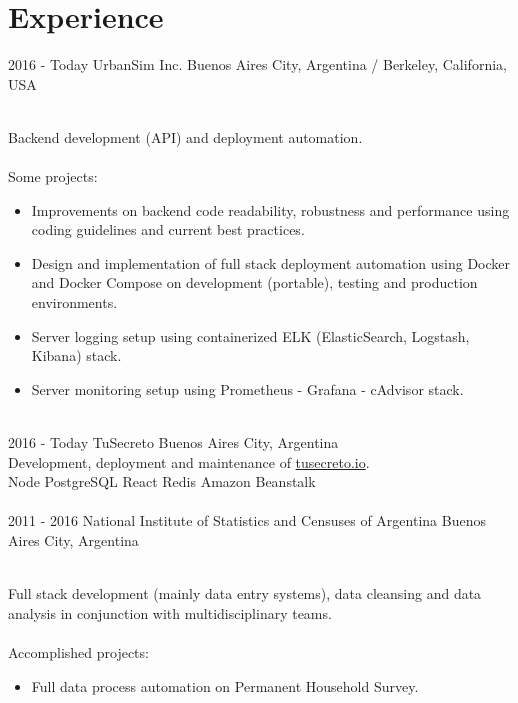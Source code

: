 \documentclass[]{cv-style}          %
\begin{document}
\section{Experience}

\begin{entrylist}
\entry
  {2016 - Today}
  {UrbanSim Inc.}
  {Buenos Aires City, Argentina / Berkeley, California, USA}
  {\\
  Backend development (API) and deployment automation.\\\
  \\
  Some projects:
  \begin{itemize}
  	\item Improvements on backend code readability, robustness and performance 
    using coding guidelines and current best practices.
  	\item Design and implementation of full stack deployment automation using Docker 
    and Docker Compose on development (portable), testing and production environments.
    \item Server logging setup using containerized ELK (ElasticSearch, Logstash, Kibana) stack.
    \item Server monitoring setup using Prometheus - Grafana - cAdvisor stack.
  \end{itemize}
}\\
\entry
  {2016 - Today}
  {TuSecreto}
  {Buenos Aires City, Argentina}
  {\\
  Development, deployment and maintenance of \href{https://tusecreto.io/}{tusecreto.io}.
  \\
  Node \textbullet{} PostgreSQL \textbullet{} React \textbullet{} Redis
  \textbullet{} Amazon Beanstalk\\
}\\
\entry
  {2011 - 2016}
  {National Institute of Statistics and Censuses of Argentina}
  {Buenos Aires City, Argentina}
  {\\
  Full stack development (mainly data entry systems), data cleansing and data 
  analysis in conjunction with multidisciplinary teams.\\\
  \\
  Accomplished projects:
  \begin{itemize}
  	\item Full data process automation on Permanent Household Survey.

\end{itemize}}
\end{entrylist}
\end{document}
